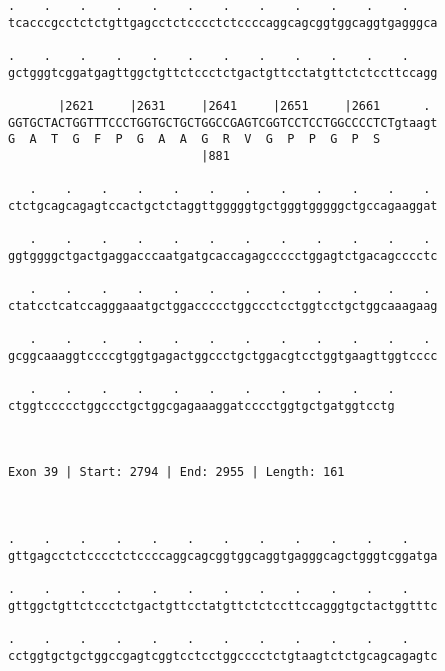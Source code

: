 \documentclass{article}
\begin{document}
\begin{Verbatim}
.    .    .    .    .    .    .    .    .    .    .    .    
tcacccgcctctctgttgagcctctcccctctccccaggcagcggtggcaggtgagggca
                                                            
.    .    .    .    .    .    .    .    .    .    .    .    
gctgggtcggatgagttggctgttctccctctgactgttcctatgttctctccttccagg
                                                            
       |2621     |2631     |2641     |2651     |2661      . 
GGTGCTACTGGTTTCCCTGGTGCTGCTGGCCGAGTCGGTCCTCCTGGCCCCTCTgtaagt
G  A  T  G  F  P  G  A  A  G  R  V  G  P  P  G  P  S        
                           |881                             
  
   .    .    .    .    .    .    .    .    .    .    .    . 
ctctgcagcagagtccactgctctaggttgggggtgctgggtgggggctgccagaaggat
                                                            
   .    .    .    .    .    .    .    .    .    .    .    . 
ggtggggctgactgaggacccaatgatgcaccagagccccctggagtctgacagcccctc
                                                            
   .    .    .    .    .    .    .    .    .    .    .    . 
ctatcctcatccagggaaatgctggaccccctggccctcctggtcctgctggcaaagaag
                                                            
   .    .    .    .    .    .    .    .    .    .    .    . 
gcggcaaaggtccccgtggtgagactggccctgctggacgtcctggtgaagttggtcccc
                                                            
   .    .    .    .    .    .    .    .    .    .    .
ctggtccccctggccctgctggcgagaaaggatcccctggtgctgatggtcctg
                                                      
                                                      
 
Exon 39 | Start: 2794 | End: 2955 | Length: 161



.    .    .    .    .    .    .    .    .    .    .    .    
gttgagcctctcccctctccccaggcagcggtggcaggtgagggcagctgggtcggatga
                                                            
.    .    .    .    .    .    .    .    .    .    .    .    
gttggctgttctccctctgactgttcctatgttctctccttccagggtgctactggtttc
                                                            
.    .    .    .    .    .    .    .    .    .    .    .    
cctggtgctgctggccgagtcggtcctcctggcccctctgtaagtctctgcagcagagtc
                                                            

\end{Verbatim}
\end{document}
